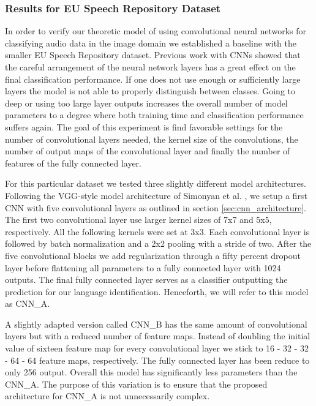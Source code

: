 \subsubsection{Results for EU Speech Repository Dataset}
\label{sec:results_eu}
In order to verify our theoretic model of using convolutional neural networks for classifying audio data in the image domain we established a baseline with the smaller EU Speech Repository dataset. Previous work with CNNs showed that the careful arrangement of the neural network layers has a great effect on the final classification performance. If one does not use enough or sufficiently large layers the model is not able to properly distinguish between classes. Going to deep or using too large layer outputs increases the overall number of model parameters to a degree where both training time and classification performance suffers again. The goal of this experiment is find favorable settings for the number of convolutional layers needed, the kernel size of the convolutions, the number of output maps of the convolutional layer and finally the number of features of the fully connected layer.

For this particular dataset we tested three slightly different model architectures. Following the VGG-style model architecture of Simonyan et al. \cite{Chatfield14}, we setup a first CNN with five convolutional layers as outlined in section \ref{sec:cnn_architecture}. The first two convolutional layer use larger kernel sizes of 7x7 and 5x5, respectively. All the following kernels were set at 3x3. Each convolutional layer is followed by batch normalization and a 2x2 pooling with a stride of two. After the five convolutional blocks we add regularization through a fifty percent dropout layer before flattening all parameters to a fully connected layer with 1024 outputs. The final fully connected layer serves as a classifier outputting the prediction for our language identification. Henceforth, we will refer to this model as CNN\_A.

A slightly adapted version called CNN\_B has the same amount of convolutional layers but with a reduced number of feature maps. Instead of doubling the initial value of sixteen feature map for every convolutional layer we stick to 16 - 32 - 32 - 64 - 64 feature maps, respectively. The fully connected layer has been reduce to only 256 output. Overall this model has significantly less parameters than the CNN\_A. The purpose of this variation is to ensure that the proposed architecture for CNN\_A is not unnecessarily complex.
	
